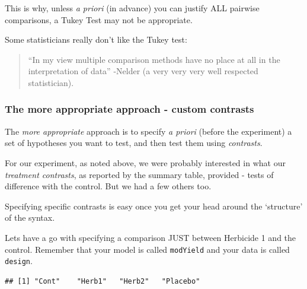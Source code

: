 \documentclass[
]{book}
\newenvironment{Shaded}{\begin{snugshade}}{\end{snugshade}}
\newcommand{\CommentTok}[1]{\textcolor[rgb]{0.56,0.35,0.01}{\textit{#1}}}
\newcommand{\FunctionTok}[1]{\textcolor[rgb]{0.13,0.29,0.53}{\textbf{#1}}}
\newcommand{\NormalTok}[1]{#1}
\newcommand{\SpecialCharTok}[1]{\textcolor[rgb]{0.81,0.36,0.00}{\textbf{#1}}}
\begin{document}
This is why, unless \emph{a priori} (in advance) you can justify ALL pairwise comparisons, a Tukey Test may not be appropriate.

Some statisticians really don't like the Tukey test:

\begin{quote}
``In my view multiple comparison methods have no place at all in the interpretation of data'' -Nelder (a very very very well respected statistician).
\end{quote}

\hypertarget{the-more-appropriate-approach---custom-contrasts}{%
\subsubsection{The more appropriate approach - custom contrasts}\label{the-more-appropriate-approach---custom-contrasts}}

The \emph{more appropriate} approach is to specify \emph{a priori} (before the experiment) a set of hypotheses you want to test, and then test them using \emph{contrasts}.

For our experiment, as noted above, we were probably interested in what our \emph{treatment contrasts}, as reported by the summary table, provided - tests of difference with the control. But we had a few others too.

Specifying specific contrasts is easy once you get your head around the `structure' of the syntax.

Lets have a go with specifying a comparison JUST between Herbicide 1 and the control. Remember that your model is called \texttt{modYield} and your data is called \texttt{design}.

\begin{Shaded}
\end{Shaded}

\begin{verbatim}
## [1] "Cont"    "Herb1"   "Herb2"   "Placebo"
\end{verbatim}
\end{document}
